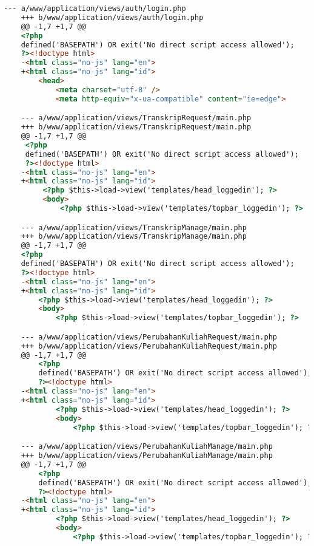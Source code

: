 \begin{lstlisting}[frame=single, label={lst:perbaikan_3.1.1_bahasa_halaman}, language=HTML, caption=Perbaikan Kriteria Sukses 3.1.1 - Bahasa yang Tidak Sesuai]
    --- a/www/application/views/auth/login.php
    +++ b/www/application/views/auth/login.php
    @@ -1,7 +1,7 @@
    <?php
    defined('BASEPATH') OR exit('No direct script access allowed');
    ?><!doctype html>
    -<html class="no-js" lang="en">
    +<html class="no-js" lang="id">
        <head>
            <meta charset="utf-8" />
            <meta http-equiv="x-ua-compatible" content="ie=edge">

    --- a/www/application/views/TranskripRequest/main.php
    +++ b/www/application/views/TranskripRequest/main.php
    @@ -1,7 +1,7 @@
     <?php
     defined('BASEPATH') OR exit('No direct script access allowed');
     ?><!doctype html>
    -<html class="no-js" lang="en">
    +<html class="no-js" lang="id">
         <?php $this->load->view('templates/head_loggedin'); ?>
         <body>
             <?php $this->load->view('templates/topbar_loggedin'); ?>

    --- a/www/application/views/TranskripManage/main.php
    +++ b/www/application/views/TranskripManage/main.php
    @@ -1,7 +1,7 @@
    <?php
    defined('BASEPATH') OR exit('No direct script access allowed');
    ?><!doctype html>
    -<html class="no-js" lang="en">
    +<html class="no-js" lang="id">
        <?php $this->load->view('templates/head_loggedin'); ?>
        <body>
            <?php $this->load->view('templates/topbar_loggedin'); ?>

    --- a/www/application/views/PerubahanKuliahRequest/main.php
    +++ b/www/application/views/PerubahanKuliahRequest/main.php
    @@ -1,7 +1,7 @@
        <?php
        defined('BASEPATH') OR exit('No direct script access allowed');
        ?><!doctype html>
    -<html class="no-js" lang="en">
    +<html class="no-js" lang="id">
            <?php $this->load->view('templates/head_loggedin'); ?>
            <body>
                <?php $this->load->view('templates/topbar_loggedin'); ?>

    --- a/www/application/views/PerubahanKuliahManage/main.php
    +++ b/www/application/views/PerubahanKuliahManage/main.php
    @@ -1,7 +1,7 @@
        <?php
        defined('BASEPATH') OR exit('No direct script access allowed');
        ?><!doctype html>
    -<html class="no-js" lang="en">
    +<html class="no-js" lang="id">
            <?php $this->load->view('templates/head_loggedin'); ?>
            <body>
                <?php $this->load->view('templates/topbar_loggedin'); ?>


\end{lstlisting}
